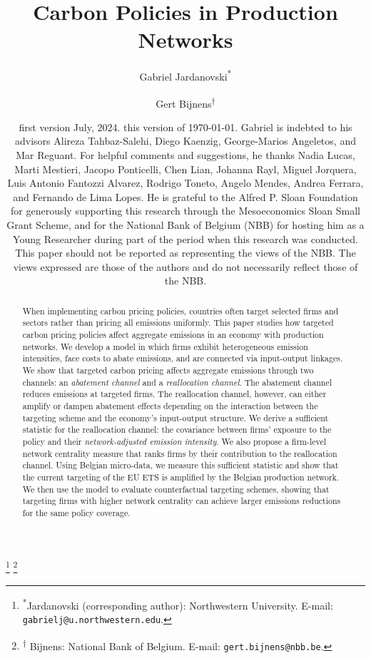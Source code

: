 \documentclass[11pt, reqno]{amsart}
\theoremstyle{definition}
\begin{document}
\title[]{Carbon Policies in Production Networks}

\author[]{Gabriel Jardanovski\textsuperscript{*} \and Gert Bijnens\textsuperscript{$\dagger$}}
\thanks{\noindent \textsuperscript{*}Jardanovski (corresponding author): Northwestern University. E-mail: \texttt{gabrielj@u.northwestern.edu}.}
\thanks{\textsuperscript{$\dagger$} Bijnens: National Bank of Belgium. E-mail: \texttt{gert.bijnens@nbb.be}.}

\date{\tiny{\sc first version} July, 2024.  {\sc this version} of  \today. Gabriel is indebted to his advisors Alireza Tahbaz-Salehi, Diego Kaenzig, George-Marios Angeletos, and Mar Reguant. For helpful comments and suggestions, he thanks Nadia Lucas, Marti Mestieri, Jacopo Ponticelli, Chen Lian, Johanna Rayl, Miguel Jorquera, Luis Antonio Fantozzi Alvarez, Rodrigo Toneto, Angelo Mendes, Andrea Ferrara, and Fernando de Lima Lopes. He is grateful to the Alfred P. Sloan Foundation for generously supporting this research through the Mesoeconomics Sloan Small Grant Scheme, and for the National Bank of Belgium (NBB) for hosting him as a Young Researcher during part of the period when this research was conducted. This paper should not be reported as representing the views of the NBB. The views expressed are those of the authors and do not necessarily reflect those of the NBB.}

\begin{abstract}
When implementing carbon pricing policies, countries often target selected firms and sectors rather than pricing all emissions uniformly. This paper studies how targeted carbon pricing policies affect aggregate emissions in an economy with production networks. We develop a model in which firms exhibit heterogeneous emission intensities, face costs to abate emissions, and are connected via input-output linkages. We show that targeted carbon pricing affects aggregate emissions through two channels: an \textit{abatement channel} and a \textit{reallocation channel}. The abatement channel reduces emissions at targeted firms. The reallocation channel, however, can either amplify or dampen abatement effects depending on the interaction between the targeting scheme and the economy's input-output structure. We derive a sufficient statistic for the reallocation channel: the covariance between firms' exposure to the policy and their \textit{network-adjusted emission intensity}. We also propose a firm-level network centrality measure that ranks firms by their contribution to the reallocation channel. Using Belgian micro-data, we measure this sufficient statistic and show that the current targeting of the EU ETS is amplified by the Belgian production network. We then use the model to evaluate counterfactual targeting schemes, showing that targeting firms with higher network centrality can achieve larger emissions reductions for the same policy coverage.
\end{abstract}
\end{document}
